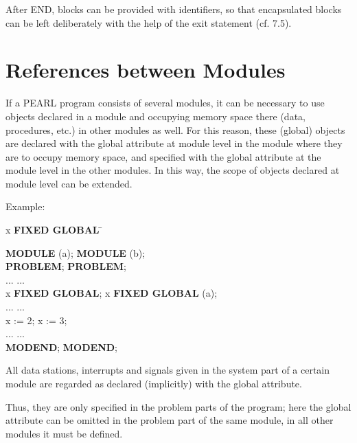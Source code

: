 After END, blocks can be provided with identifiers, so that encapsulated
blocks can be left deliberately with the help of the exit statement
(cf. 7.5).

\section{References between Modules}  %
\label{sec_references_module}

If a PEARL program consists of several modules, it can be necessary to
use objects declared in a module and occupying memory space there (data,
procedures, etc.) in other modules as well. For this reason, these
(global) objects are declared with the global attribute at module level
in the module where they are to occupy memory space, and specified with
the global attribute at the module level in the other modules. In this
way, the scope of objects declared at module level can be extended.

Example:

\begin{tabbing}
 x {\bf FIXED GLOBAL} \hspace{2cm} \= \kill

{\bf MODULE} (a);                  \> {\bf MODULE} (b); \\
{\bf PROBLEM};                     \> {\bf PROBLEM};\\
\x ...                             \> \x ...\\
 x {\bf FIXED GLOBAL}; \>  x {\bf FIXED GLOBAL} (a);\\
\x ...                             \> \x ...\\
\x x := 2;                         \> \x x := 3;\\
\x ...                             \> \x ...\\
{\bf MODEND};                      \> {\bf MODEND};
\end{tabbing}

All data stations, interrupts and signals given in the system part of a
certain module are regarded as declared (implicitly) with the global
attribute.
\begin{removed}
Thus, they are only specified in the problem parts of the
program; here the global attribute can be omitted in the problem part of
the same module, in all other modules it must be defined.
\end{removed}

